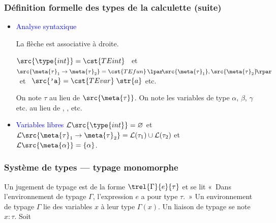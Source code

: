 %
\begin{frame}
\frametitle{Définition formelle des types de la calculette (suite)}

\begin{itemize}

  \item \textcolor{blue}{Analyse syntaxique}

  La flèche est associative à droite.

  $\src{\type{int}} =
  \cst{TEint}$ \ et \ $\src{\meta{\tau}_1 \rightarrow \meta{\tau}_2}
  = \cst{TEfun} \, \lpar\!\src{\meta{\tau}_1},
  \src{\meta{\tau}_2}\!\rpar$ \ et \ $\src{\texttt{'a}} = \cst{TEvar} \;
  \str{a}$ etc.

  On note $\tau$ au lieu de $\src{\meta{\tau}}$.
  On note les variables de type $\alpha$, $\beta$, $\gamma$ etc. au
  lieu de  ,  , 
   etc.

  \smallskip

  \item \textcolor{blue}{Variables libres} ${\cal L} \src{\type{int}} =
  \varnothing$ et ${\cal L} \src{\meta{\tau}_1 \rightarrow
  \meta{\tau}_2} = {\cal L} (\tau_1) \cup {\cal L} (\tau_2)$ et ${\cal
    L} \src{\meta{\alpha}} = \{\alpha\}$.

\end{itemize}

\end{frame}

%
\begin{frame}
\frametitle{Système de types --- typage monomorphe}

Un jugement de typage est de la forme $\trel{\Gamma}{e}{\tau}$ et se
lit «~Dans l'environnement de typage $\Gamma$, l'expression $e$ a pour
type $\tau$.~» Un environnement de typage $\Gamma$ lie des variables
$x$ à leur type $\Gamma(x)$. Un liaison de typage se note $x :
\tau$. Soit

\end{frame}


